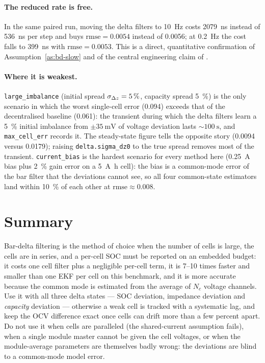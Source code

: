 \paragraph{The reduced rate is free.} In the same paired run, moving the delta filters to
\SI{10}{\hertz} costs \SI{2079}{\nano\second} instead of \SI{536}{\nano\second} per step and buys
$\text{rmse}=\num{0.0054}$ instead of \num{0.0056}; at \SI{0.2}{\hertz} the cost falls to
\SI{399}{\nano\second} with $\text{rmse}=\num{0.0053}$. This is a direct, quantitative
confirmation of Assumption~\ref{as:bd-slow} and of the central engineering claim of
\cite{plett2009bardelta}.

\paragraph{Where it is weakest.} \texttt{large\_imbalance} (initial spread
$\sigma_{\Delta z}=\SI{5}{\percent}$, capacity spread \SI{5}{\percent}) is the only scenario in
which the worst single-cell error (\num{0.094}) exceeds that of the decentralised baseline
(\num{0.061}): the transient during which the delta filters learn a \SI{5}{\percent} initial
imbalance from $\pm\SI{35}{\milli\volt}$ of voltage deviation lasts $\sim\SI{100}{\second}$, and
\texttt{max\_cell\_err} records it. The steady-state figure tells the opposite story
(\num{0.0094} versus \num{0.0179}); raising \texttt{delta.sigma\_dz0} to the true spread removes
most of the transient. \texttt{current\_bias} is the hardest scenario for every method here
(\SI{0.25}{\ampere} bias plus \SI{2}{\percent} gain error on a \SI{5}{\ampere\hour} cell): the
bias is a common-mode error of the bar filter that the deviations cannot see, so all four
common-state estimators land within \SI{10}{\percent} of each other at
$\text{rmse}\approx\num{0.008}$.

\section{Summary}
Bar-delta filtering is the method of choice when the number of cells is large, the cells are in
series, and a per-cell SOC must be reported on an embedded budget: it costs one cell filter plus
a negligible per-cell term, it is \num{7}--\num{10} times faster and smaller than one EKF per
cell on this benchmark, and it is more accurate because the common mode is estimated from the
average of $N_c$ voltage channels. Use it with all three delta states --- SOC deviation,
impedance deviation and \emph{capacity} deviation --- otherwise a weak cell is tracked with a
systematic lag, and keep the OCV difference exact once cells can drift more than a few percent
apart. Do not use it when cells are paralleled (the shared-current assumption fails), when a
single module master cannot be given the cell voltages, or when the module-average parameters are
themselves badly wrong: the deviations are blind to a common-mode model error.
